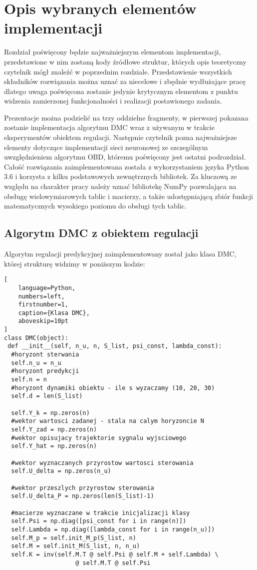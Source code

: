 \newpage %
\section{Opis wybranych elementów implementacji}
Rozdział poświęcony będzie najważniejszym elementom implementacji, przedstawione w nim zostaną kody źródłowe struktur, których opis teoretyczny czytelnik mógł znaleźć w poprzednim rozdziale. Przedstawienie wszystkich składników rozwiązania można uznać za niecelowe i zbędnie wydłużające pracę dlatego uwaga poświęcona zostanie jedynie krytycznym elementom z punktu widzenia zamierzonej funkcjonalności i realizacji postawionego zadania.
\par Prezentacje można podzielić na trzy oddzielne fragmenty, w pierwszej pokazana zostanie implementacja algorytmu DMC wraz z używanym w trakcie eksperymentów obiektem regulacji. Następnie czytelnik pozna najważniejsze elementy dotyczące implementacji sieci neuronowej ze szczególnym uwzględnieniem algorytmu OBD, któremu poświęcony jest ostatni podrozdział. Całość rozwiązania zaimplementowana została z wykorzystaniem języka Python 3.6 i korzysta z kilku podstawowych zewnętrznych bibliotek. Za kluczową ze względu na charakter pracy należy uznać bibliotekę NumPy pozwalająca na obsługę wielowymiarowych tablic i macierzy, a także udostępniającą zbiór funkcji matematycznych wysokiego poziomu do obsługi tych tablic. 

\subsection{Algorytm DMC z obiektem regulacji}
Algorytm regulacji predykcyjnej zaimplementowany został jako klasa DMC, której strukturę widzimy w poniższym kodzie: 
\begin{addmargin}[10mm]{0mm}
\begin{lstlisting}[
    language=Python,
    numbers=left,
    firstnumber=1,
    caption={Klasa DMC},
    aboveskip=10pt  
]
class DMC(object):
 def __init__(self, n_u, n, S_list, psi_const, lambda_const):		
  #horyzont sterwania 
  self.n_u = n_u
  #horyzont predykcji
  self.n = n 
  #horyzont dynamiki obiektu - ile s wyzaczamy (10, 20, 30)
  self.d = len(S_list)

  self.Y_k = np.zeros(n)
  #wektor wartosci zadanej - stala na calym horyzoncie N
  self.Y_zad = np.zeros(n)
  #wektor opisujacy trajektorie sygnalu wyjsciowego 
  self.Y_hat = np.zeros(n)

  #wektor wyznaczanych przyrostow wartosci sterowania 
  self.U_delta = np.zeros(n_u)

  #wektor przeszlych przyrostow sterowania
  self.U_delta_P = np.zeros(len(S_list)-1)
		
  #macierze wyznaczane w trakcie inicjalizacji klasy
  self.Psi = np.diag([psi_const for i in range(n)])
  self.Lambda = np.diag([lambda_const for i in range(n_u)])
  self.M_p = self.init_M_p(S_list, n)
  self.M = self.init_M(S_list, n, n_u)
  self.K = inv(self.M.T @ self.Psi @ self.M + self.Lambda) \ 
					@ self.M.T @ self.Psi
\end{lstlisting}
\end{addmargin}

